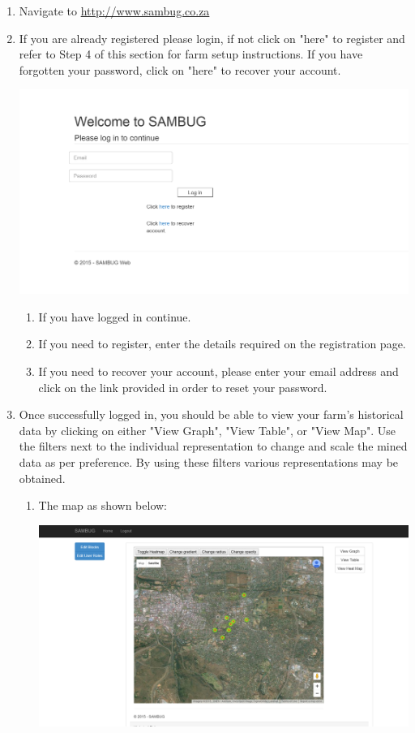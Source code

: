 \documentclass[11pt,a4paper,titlepage]{article}
\begin{document}
	\begin{enumerate}
		\item Navigate to \url{http://www.sambug.co.za}
		\item If you are already registered please login, if not click on "here" to register and refer to Step 4 of this section for farm setup instructions. If you have forgotten your password, click on "here" to recover your account. 
	\begin{center}
		\includegraphics[scale=0.7]{login_page.png}
	\end{center}
		\begin{enumerate}
			\item If you have logged in continue.
			\item If you need to register, enter the details required on the registration page.
			\item If you need to recover your account, please enter your email address and click on the link provided in order to reset your password.
		\end{enumerate}
\item Once successfully logged in, you should be able to view your farm's historical data by clicking on either "View Graph", "View Table", or "View Map". Use the filters next to the individual representation to change and scale the mined data as per preference. By using these filters various representations may be obtained.
		\begin{enumerate}
			\item The map as shown below:
			\begin{center}
				\includegraphics[scale=0.3]{map.png}

\end{center}
\end{enumerate}
\end{enumerate}
\end{document}
